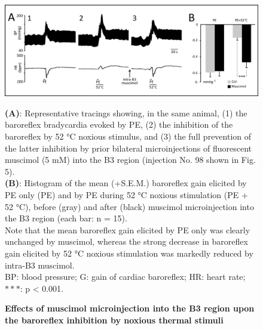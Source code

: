 \documentclass[a4paper,12pt,twoside]{report}
\begin{document}
\begin{figure}[p]

\begin{center}
 \includegraphics[scale=1]{Article2-FIG6.jpg} 
\end{center}

\caption[Effects of intra-B3 muscimol microinjection on the baroreflex inhibition]{\textbf{Effects of muscimol microinjection into the B3 region upon the baroreflex inhibition by noxious thermal stimuli}}

{\protect\parbox[t]{18cm}{
\begin{small}
\textbf{(A)}: Representative tracings showing, in the same animal, (1) the baroreflex bradycardia evoked by PE, (2) the inhibition of the baroreflex by 52 °C noxious stimulus, and (3) the full prevention of the latter inhibition by prior bilateral microinjections of fluorescent muscimol (5 mM) into the B3 region (injection No. 98 shown in Fig. 5).\\ 
\textbf{(B)}: Histogram of the mean (+S.E.M.) baroreflex gain elicited by PE only (PE) and by PE during 52 °C noxious stimulation (PE + 52 °C), before (gray) and after (black) muscimol microinjection into the B3 region (each bar: n = 15).\\ 
Note that the mean baroreflex gain elicited by PE only was clearly unchanged by muscimol, whereas the strong decrease in baroreflex gain elicited by 52 °C noxious stimulation was markedly reduced by intra-B3 muscimol.\\ 
BP: blood pressure; G: gain of cardiac baroreflex; HR: heart rate; $***$: p < 0.001.
\end{small}}}

\label{Article2-FIG6}

\end{figure}
\end{document}
